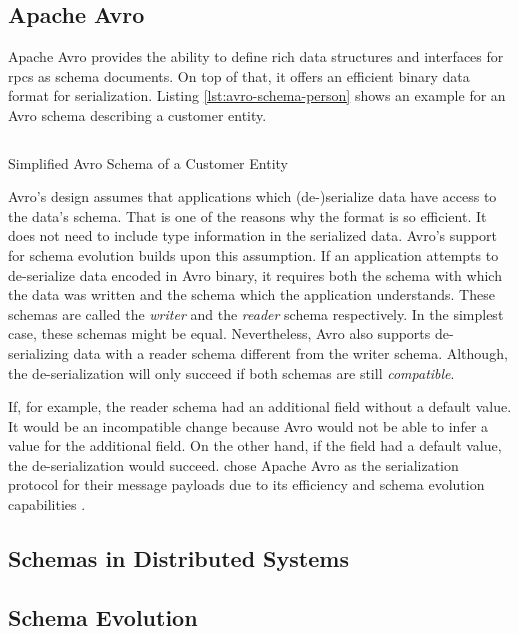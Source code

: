 \subsection{Apache Avro}

Apache Avro provides the ability to define rich data structures and interfaces for \glspl{rpc} as schema documents.
On top of that, it offers an efficient binary data format for serialization.
Listing \ref{lst:avro-schema-person} shows an example for an Avro schema describing a customer entity.
\parencite{apache_software_foundation_apache_2021}

\begin{listing}[H]
  \inputminted{json}{assets/src/Customer.avsc}
  \caption{Simplified Avro Schema of a Customer Entity}\label{lst:avro-schema-person}
\end{listing}

Avro's design assumes that applications which (de-)serialize data have access to the data's schema.
That is one of the reasons why the format is so efficient.
It does not need to include type information in the serialized data.
Avro's support for schema evolution builds upon this assumption.
If an application attempts to de-serialize data encoded in Avro binary, it requires both the schema with which the data was written and the schema which the application understands.
These schemas are called the \emph{writer} and the \emph{reader} schema respectively.
In the simplest case, these schemas might be equal.
Nevertheless, Avro also supports de-serializing data with a reader schema different from the writer schema.
Although, the de-serialization will only succeed if both schemas are still \emph{compatible}.
\parencite{apache_software_foundation_apache_2021}

If, for example, the reader schema had an additional field without a default value.
It would be an incompatible change because Avro would not be able to infer a value for the additional field.
On the other hand, if the field had a default value, the de-serialization would succeed.
\citeauthor{kreps_kafka_2011} chose Apache Avro as the serialization protocol for their message payloads due to its efficiency and schema evolution capabilities \parencite{kreps_kafka_2011}. 

\subsection{Schemas in Distributed Systems}

\subsection{Schema Evolution}

